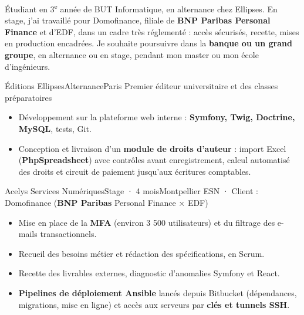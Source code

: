 
\renewcommand{\cvheadline}{Étudiant en informatique en alternance \,·\, Expérience en environnement bancaire}
\renewcommand{\cvheaddomains}{Sécurité \,·\, Bases de données \& SQL \,·\, DevOps \,·\, Mathématiques}


\makeheader

\begin{minipage}[t]{\mainwidth}
\raggedright

Étudiant en 3\textsuperscript{e} année de BUT Informatique, en alternance chez Ellipses. En stage, j'ai
travaillé pour Domofinance, filiale de \textbf{BNP Paribas Personal Finance} et d'EDF, dans un cadre très réglementé : accès sécurisés,
recette, mises en production encadrées. Je souhaite poursuivre dans la
\textbf{banque ou un grand groupe}, en alternance ou en stage, pendant mon master ou mon école d'ingénieurs.
\keyfigures


  {Éditions Ellipses}{Alternance}{Paris}
  {Premier éditeur universitaire et des classes préparatoires}
\begin{itemize}
  \item Développement sur la plateforme web interne : \textbf{Symfony, Twig, Doctrine, MySQL}, tests, Git.
  \item Conception et livraison d'un \textbf{module de droits d'auteur} : import Excel (\textbf{PhpSpreadsheet}) avec contrôles avant enregistrement, calcul automatisé des droits et circuit de paiement jusqu'aux écritures comptables.
\end{itemize}

  {Acelys Services Numériques}{Stage · 4 mois}{Montpellier}
  {ESN · Client : Domofinance (\textbf{\color{ink}BNP Paribas} Personal Finance × EDF)}
\begin{itemize}
  \item Mise en place de la \textbf{MFA} (environ 3 500 utilisateurs) et du filtrage des e-mails transactionnels.
  \item Recueil des besoins métier et rédaction des spécifications, en Scrum.
  \item Recette des livrables externes, diagnostic d'anomalies Symfony et React.
  \item \textbf{Pipelines de déploiement Ansible} lancés depuis Bitbucket (dépendances, migrations, mise en ligne) et accès aux serveurs par \textbf{clés et tunnels SSH}.
\end{itemize}


\end{minipage}
